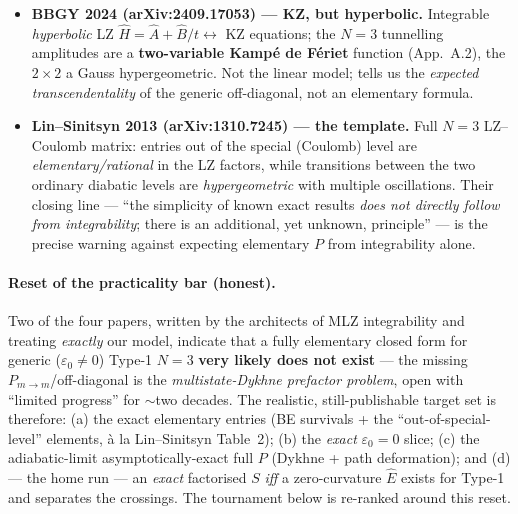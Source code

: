 \documentclass[11pt]{article}
\newcommand{\eps}{\varepsilon}
\newcommand{\Pmid}{P_{m\to m}}
\begin{document}
\begin{itemize}[nosep,leftmargin=1.4em]
  exists \emph{and} the path can be deformed to separate all crossings.
\item \textbf{BBGY 2024 (arXiv:2409.17053) --- KZ, but hyperbolic.} Integrable
  \emph{hyperbolic} LZ $\hat H=\hat A+\hat B/t\leftrightarrow$ KZ equations; the $N{=}3$ tunnelling
  amplitudes are a \textbf{two-variable Kamp\'e de F\'eriet} function (App.~A.2), the $2\times2$
  a Gauss hypergeometric. Not the linear model; tells us the \emph{expected transcendentality} of
  the generic off-diagonal, not an elementary formula.
\item \textbf{Lin--Sinitsyn 2013 (arXiv:1310.7245) --- the template.} Full $N{=}3$ LZ--Coulomb
  matrix: entries out of the special (Coulomb) level are \emph{elementary/rational} in the LZ
  factors, while transitions between the two ordinary diabatic levels are \emph{hypergeometric}
  with multiple oscillations. Their closing line --- ``the simplicity of known exact results
  \emph{does not directly follow from integrability}; there is an additional, yet unknown,
  principle'' --- is the precise warning against expecting elementary $P$ from integrability alone.
\end{itemize}

\paragraph{Reset of the practicality bar (honest).} Two of the four papers, written by the
architects of MLZ integrability and treating \emph{exactly} our model, indicate that a fully
elementary closed form for generic ($\eps_0\ne0$) Type-1 $N{=}3$ \textbf{very likely does not
exist} --- the missing $\Pmid$/off-diagonal is the \emph{multistate-Dykhne prefactor problem},
open with ``limited progress'' for $\sim$two decades. The realistic, still-publishable target set
is therefore: (a) the exact elementary entries (BE survivals + the ``out-of-special-level''
elements, à la Lin--Sinitsyn Table~2); (b) the \emph{exact} $\eps_0=0$ slice; (c) the
adiabatic-limit asymptotically-exact full $P$ (Dykhne + path deformation); and (d) --- the
home run --- an \emph{exact} factorised $S$ \emph{iff} a zero-curvature $\hat E$ exists for Type-1
and separates the crossings. The tournament below is re-ranked around this reset.
\end{document}
